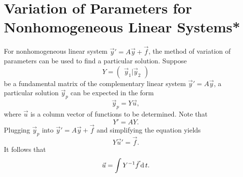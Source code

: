 \section{Variation of Parameters for Nonhomogeneous Linear Systems*}

For nonhomogeneous linear system $\vec{y}'=A\vec{y}+\vec{f}$, the method of variation of parameters can be used to find a particular solution. Suppose
\[
Y=\begin{pmatrix}
  \vec{y}_1 | \vec{y}_2
\end{pmatrix}  
\]
be a fundamental matrix of the complementary linear system $\vec{y}'=A\vec{y}$, a particular solution $\vec{y}_p$ can be expected in the form
\[
\vec{y}_p=Y\vec{u},  
\]
where $\vec{u}$ is a column vector of functions to be determined. Note that
\[Y'=AY.\]
Plugging $\vec{y}_p$ into $\vec{y}'=A\vec{y}+\vec{f}$ and simplifying the equation yields
\[Y\vec{u}'=\vec{f}.\]
It follows that
\[
\vec{u}=\int Y^{-1}\vec{f} \operatorname{d} t.  
\]

